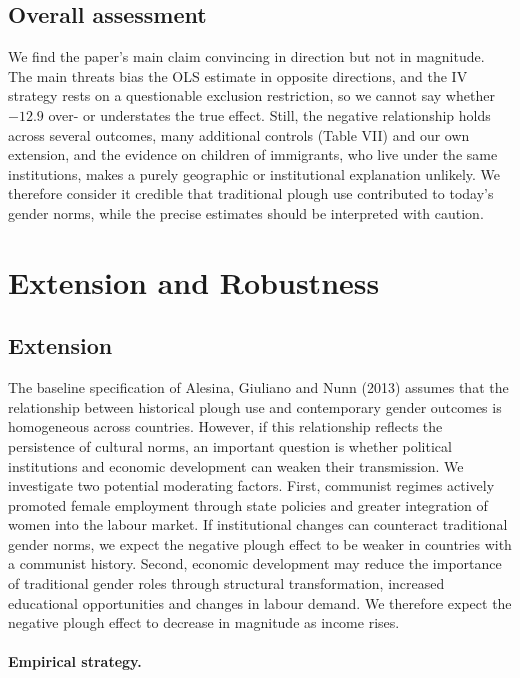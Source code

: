 \documentclass[12pt,a4paper]{article}
\begin{document}
\subsection{Overall assessment}

We find the paper's main claim convincing in direction but not in magnitude. The main threats bias the OLS estimate in opposite directions, and the IV strategy rests on a questionable exclusion restriction, so we cannot say whether $-12.9$ over- or understates the true effect. Still, the negative relationship holds across several outcomes, many additional controls (Table VII) and our own extension, and the evidence on children of immigrants, who live under the same institutions, makes a purely geographic or institutional explanation unlikely. We therefore consider it credible that traditional plough use contributed to today's gender norms, while the precise estimates should be interpreted with caution.

\section{Extension and Robustness}
 \subsection{Extension}

The baseline specification of Alesina, Giuliano and Nunn (2013) assumes that the relationship between historical plough use and contemporary gender outcomes is homogeneous across countries. However, if this relationship reflects the persistence of cultural norms, an important question is whether political institutions and economic development can weaken their transmission. We investigate two potential moderating factors. First, communist regimes actively promoted female employment through state policies and greater integration of women into the labour market. If institutional changes can counteract traditional gender norms, we expect the negative plough effect to be weaker in countries with a communist history. Second, economic development may reduce the importance of traditional gender roles through structural transformation, increased educational opportunities and changes in labour demand. We therefore expect the negative plough effect to decrease in magnitude as income rises.

\paragraph{Empirical strategy.}
\end{document}

